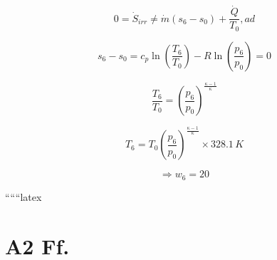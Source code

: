 \[
0 = \dot{S}_{irr} \neq \dot{m} (s_6 - s_0) + \frac{\dot{Q}}{T_0}, ad
\]

\[
s_6 - s_0 = c_p \ln \left( \frac{T_6}{T_0} \right) - R \ln \left( \frac{p_6}{p_0} \right) = 0
\]

\[
\frac{T_6}{T_0} = \left( \frac{p_6}{p_0} \right)^{\frac{\kappa - 1}{\kappa}}
\]

\[
T_6 = T_0 \left( \frac{p_6}{p_0} \right)^{\frac{\kappa - 1}{\kappa}} \times 328.1 \, K
\]

\[
\Rightarrow w_6 = 20
\]

``````latex

\section*{A2 Ff.}